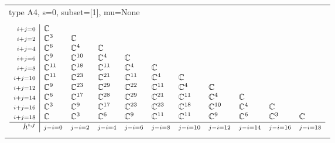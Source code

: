\documentclass[crop,border=2mm]{standalone}
\begin{document}
\begin{tabular}{l}
{\huge type A4, s=0, subset=[1], mu=None}\\ \\


$\displaystyle
\begin{array}{r|l l l l l l l l l l}
	{\scriptstyle i+j=0}&\mathbb{C}&&&&&&&&&\\
	{\scriptstyle i+j=2}&\mathbb{C}^{3}&\mathbb{C}&&&&&&&&\\
	{\scriptstyle i+j=4}&\mathbb{C}^{6}&\mathbb{C}^{4}&\mathbb{C}&&&&&&&\\
	{\scriptstyle i+j=6}&\mathbb{C}^{9}&\mathbb{C}^{10}&\mathbb{C}^{4}&\mathbb{C}&&&&&&\\
	{\scriptstyle i+j=8}&\mathbb{C}^{11}&\mathbb{C}^{18}&\mathbb{C}^{11}&\mathbb{C}^{4}&\mathbb{C}&&&&&\\
	{\scriptstyle i+j=10}&\mathbb{C}^{11}&\mathbb{C}^{23}&\mathbb{C}^{21}&\mathbb{C}^{11}&\mathbb{C}^{4}&\mathbb{C}&&&&\\
	{\scriptstyle i+j=12}&\mathbb{C}^{9}&\mathbb{C}^{23}&\mathbb{C}^{29}&\mathbb{C}^{22}&\mathbb{C}^{11}&\mathbb{C}^{4}&\mathbb{C}&&&\\
	{\scriptstyle i+j=14}&\mathbb{C}^{6}&\mathbb{C}^{17}&\mathbb{C}^{28}&\mathbb{C}^{29}&\mathbb{C}^{21}&\mathbb{C}^{11}&\mathbb{C}^{4}&\mathbb{C}&&\\
	{\scriptstyle i+j=16}&\mathbb{C}^{3}&\mathbb{C}^{9}&\mathbb{C}^{17}&\mathbb{C}^{23}&\mathbb{C}^{23}&\mathbb{C}^{18}&\mathbb{C}^{10}&\mathbb{C}^{4}&\mathbb{C}&\\
	{\scriptstyle i+j=18}&\mathbb{C}&\mathbb{C}^{3}&\mathbb{C}^{6}&\mathbb{C}^{9}&\mathbb{C}^{11}&\mathbb{C}^{11}&\mathbb{C}^{9}&\mathbb{C}^{6}&\mathbb{C}^{3}&\mathbb{C}\\
	\hline h^{i,j}&{\scriptstyle j-i=0}&{\scriptstyle j-i=2}&{\scriptstyle j-i=4}&{\scriptstyle j-i=6}&{\scriptstyle j-i=8}&{\scriptstyle j-i=10}&{\scriptstyle j-i=12}&{\scriptstyle j-i=14}&{\scriptstyle j-i=16}&{\scriptstyle j-i=18}
\end{array}
$ \\ \\



\end{tabular}
\end{document}
